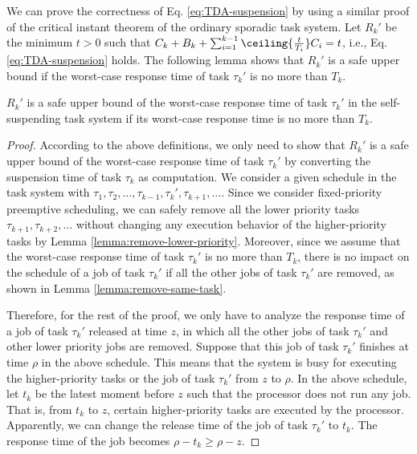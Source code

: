 We can prove the correctness of Eq. \eqref{eq:TDA-suspension} by using a similar proof of the critical instant theorem of the ordinary sporadic task system.
Let $R_k'$ be the minimum $t > 0$ such that  $C_k + B_k + \sum_{i=1}^{k-1}\ceiling{\frac{t}{T_i}} C_i = t$, i.e., Eq. \ref{eq:TDA-suspension} holds. The following lemma shows that $R_k'$ is a safe upper bound if the worst-case response time of task $\tau_k'$ is no more than $T_k$.

\begin{lemma}
\label{lemma:critical}
 $R_k'$ is a safe upper bound of the worst-case response time of task $\tau_k'$ in the self-suspending task system if its worst-case response time is no more than $T_k$.
\end{lemma}
\begin{proof}
According to the above definitions, we only need to show that $R_k'$ is a safe upper bound of the worst-case response time of task $\tau_k'$ by converting the suspension time of task $\tau_k$ as computation. We consider a given schedule in the task system with $\tau_1, \tau_2, \ldots, \tau_{k-1}, \tau_k', \tau_{k+1}, \ldots$. Since we consider fixed-priority preemptive scheduling, we can safely remove all the lower priority tasks $\tau_{k+1}, \tau_{k+2}, \ldots$ without changing any execution behavior of the higher-priority tasks by Lemma \ref{lemma:remove-lower-priority}. Moreover, since we assume that the worst-case response time of task $\tau_k'$ is no more than $T_k$, there is no impact on the schedule of a job of task $\tau_k'$ if all the other jobs of task $\tau_k'$ are removed, as shown in Lemma \ref{lemma:remove-same-task}. 


Therefore, for the rest of the proof, we only have to analyze the response time of a job of task $\tau_k'$ released at time $z$, in which all the other jobs of task $\tau_k'$ and other lower priority jobs are removed. Suppose that this job of task $\tau_k'$ finishes at time $\rho$ in the above schedule. This means that the system is busy for executing the higher-priority tasks or the job of task $\tau_k'$ from $z$ to $\rho$. In the above schedule, let $t_{k}$ be the latest moment before $z$ such that the processor does not run any job. That is, from $t_k$ to $z$, certain higher-priority tasks are executed by the processor. Apparently, we can change the release time of the job of task $\tau_k'$ to $t_k$. The response time of the job becomes $\rho-t_k \geq \rho-z$. 


\end{proof}
